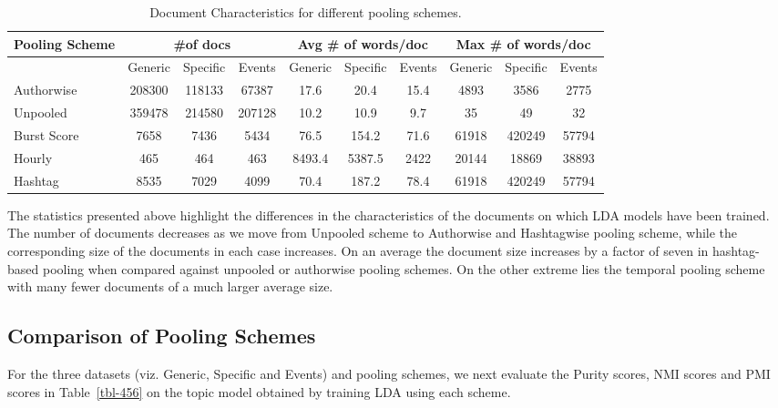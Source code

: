 \documentclass{sig-alternate}
\begin{document}
{
\begin{table*}%
\centering
\caption{Document Characteristics for different pooling schemes.}\label{tbl-3}
\resizebox{14cm}{!} 
{
	\begin{tabular}{|l|ccc|ccc|ccc|}
	\hline
	Pooling Scheme  & \multicolumn {3}{c|}{\#of docs} & \multicolumn {3}{c|}{Avg \# of words/doc} & \multicolumn {3}{c|}{Max \# of words/doc}\\
	\hline
	 & Generic & Specific & Events &  Generic & Specific & Events &  Generic & Specific & Events\\
	\hline
	Authorwise & 208300 & 118133 & 67387 & 17.6 & 20.4 & 15.4 & 4893 & 3586 & 2775 \\
	\hline
	Unpooled & 359478 & 214580 & 207128 & 10.2 & 10.9 & 9.7 & 35 & 49 & 32 \\
	\hline
	Burst Score & 7658 & 7436 & 5434 & 76.5 & 154.2 & 71.6 & 61918 & 420249 & 57794 \\
	\hline
	Hourly & 465 & 464 & 463 & 8493.4 & 5387.5 & 2422 & 20144 & 18869 & 38893 \\
	\hline
	Hashtag & 8535 & 7029 & 4099 & 70.4 & 187.2 & 78.4 & 61918 & 420249 & 57794 \\
	\hline
	\end{tabular}
}\vspace*{-6pt}
\end{table*}
}

The statistics presented above highlight the differences in the
characteristics of the documents on which LDA models have been
trained. The number of documents decreases as we move from Unpooled
scheme to Authorwise and Hashtagwise pooling scheme, while the
corresponding size of the documents in each case increases. On an
average the document size increases by a factor of seven in
hashtag-based pooling when compared against unpooled or authorwise
pooling schemes. On the other extreme lies the temporal pooling scheme
with many fewer documents of a much larger average size.

\subsection{Comparison of Pooling Schemes}

For the three datasets (viz. Generic, Specific and Events) and pooling
schemes, we next evaluate the Purity scores, NMI scores and PMI scores
in Table~\ref{tbl-456} on the topic model obtained by training LDA
using each scheme.
\end{document}
